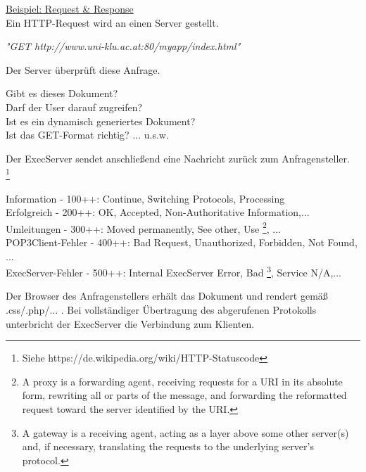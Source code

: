 \documentclass[11pt]{article}
\begin{document}
\begin{enumerate}[\thesection .1]
\begin{enumerate}[$\diamond$]
        \underline{Beispiel: Request \& Response}\\
        Ein HTTP-Request wird an einen Server gestellt.
        \begin{addmargin}[1em]{1em}
            \emph{"GET http://www.uni-klu.ac.at:80/myapp/index.html"}
        \end{addmargin}
        Der Server überprüft diese Anfrage.
        \begin{addmargin}[1em]{1em}
            Gibt es dieses Dokument?\\
            Darf der User darauf zugreifen?\\
            Ist es ein dynamisch generiertes Dokument?\\
            Ist das GET-Format richtig? ... u.s.w.
        \end{addmargin}
        Der ExecServer sendet anschließend eine Nachricht zurück zum Anfragensteller.\\
        \footnote[1 Vgl.: HTTP-Statuscodes]{Siehe https://de.wikipedia.org/wiki/HTTP-Statuscode}
        \begin{addmargin}[1em]{1em}
            Information - 100++: Continue, Switching Protocols, Processing\\
            Erfolgreich - 200++: OK, Accepted, Non-Authoritative Information,...\\
            Umleitungen - 300++: Moved permanently, See other, Use \footnote[2 Proxy]{A proxy is a
            forwarding agent, receiving requests for a URI in its absolute form,
            rewriting all or parts of the message, and forwarding the reformatted
            request toward the server identified by the URI.}, ...\\
            POP3Client-Fehler - 400++: Bad Request, Unauthorized, Forbidden, Not Found, ...\\
            ExecServer-Fehler - 500++: Internal ExecServer Error, Bad \footnote[3 Gateway]{A gateway is a
            receiving agent, acting as a layer above some other server(s) and, if
            necessary, translating the requests to the underlying server's
            protocol.}, Service N/A,...
        \end{addmargin}
        Der Browser des Anfragenstellers erhält das Dokument und rendert gemäß .css/.php/... .
        Bei vollständiger Übertragung des abgerufenen Protokolls unterbricht der ExecServer die Verbindung zum Klienten.\\


\end{enumerate}
\end{enumerate}
\end{document}
